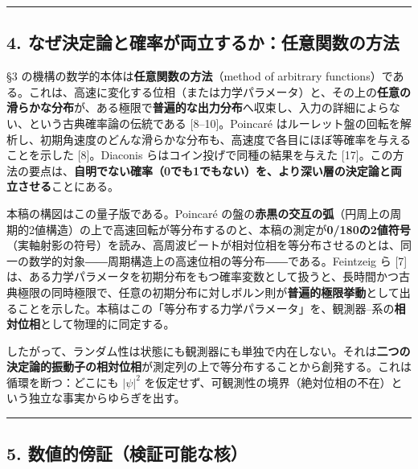\documentclass[
]{ltjsarticle}
\begin{document}
\begin{center}\rule{0.5\linewidth}{0.5pt}\end{center}

\subsection{4.
なぜ決定論と確率が両立するか：任意関数の方法}\label{ux306aux305cux6c7aux5b9aux8ad6ux3068ux78baux7387ux304cux4e21ux7acbux3059ux308bux304bux4efbux610fux95a2ux6570ux306eux65b9ux6cd5}

§3 の機構の数学的本体は\textbf{任意関数の方法}（method of arbitrary
functions）である。これは、高速に変化する位相（または力学パラメータ）と、その上の\textbf{任意の滑らかな分布}が、ある極限で\textbf{普遍的な出力分布}へ収束し、入力の詳細によらない、という古典確率論の伝統である
{[}8--10{]}。Poincaré
はルーレット盤の回転を解析し、初期角速度のどんな滑らかな分布も、高速度で各目にほぼ等確率を与えることを示した
{[}8{]}。Diaconis らはコイン投げで同種の結果を与えた
{[}17{]}。この方法の要点は、\textbf{自明でない確率（0でも1でもない）を、より深い層の決定論と両立させる}ことにある。

本稿の構図はこの量子版である。Poincaré
の盤の\textbf{赤黒の交互の弧}（円周上の周期的2値構造）の上で高速回転が等分布するのと、本稿の測定が\textbf{0/180の2値符号}（実軸射影の符号）を読み、高周波ビートが相対位相を等分布させるのとは、同一の数学的対象――周期構造上の高速位相の等分布――である。Feintzeig
ら {[}7{]}
は、ある力学パラメータを初期分布をもつ確率変数として扱うと、長時間かつ古典極限の同時極限で、任意の初期分布に対しボルン則が\textbf{普遍的極限挙動}として出ることを示した。本稿はこの「等分布する力学パラメータ」を、観測器--系の\textbf{相対位相}として物理的に同定する。

したがって、ランダム性は状態にも観測器にも単独で内在しない。それは\textbf{二つの決定論的振動子の相対位相}が測定列の上で等分布することから創発する。これは循環を断つ：どこにも
\(|\psi|^2\)
を仮定せず、可観測性の境界（絶対位相の不在）という独立な事実からゆらぎを出す。

\begin{center}\rule{0.5\linewidth}{0.5pt}\end{center}

\subsection{5.
数値的傍証（検証可能な核）}\label{ux6570ux5024ux7684ux508dux8a3cux691cux8a3cux53efux80fdux306aux6838}
\end{document}
